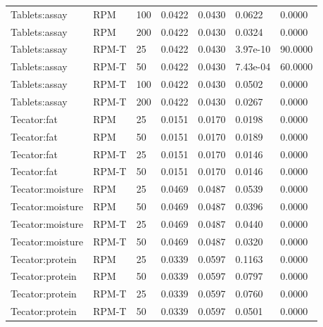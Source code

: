 \begin{tabular}{lllllll}
Tablets:assay & RPM & 100 & 0.0422 & 0.0430 & 0.0622 & 0.0000 \\
Tablets:assay & RPM & 200 & 0.0422 & 0.0430 & 0.0324 & 0.0000 \\
Tablets:assay & RPM-T & 25 & 0.0422 & 0.0430 & 3.97e-10 & 90.0000 \\
Tablets:assay & RPM-T & 50 & 0.0422 & 0.0430 & 7.43e-04 & 60.0000 \\
Tablets:assay & RPM-T & 100 & 0.0422 & 0.0430 & 0.0502 & 0.0000 \\
Tablets:assay & RPM-T & 200 & 0.0422 & 0.0430 & 0.0267 & 0.0000 \\
Tecator:fat & RPM & 25 & 0.0151 & 0.0170 & 0.0198 & 0.0000 \\
Tecator:fat & RPM & 50 & 0.0151 & 0.0170 & 0.0189 & 0.0000 \\
Tecator:fat & RPM-T & 25 & 0.0151 & 0.0170 & 0.0146 & 0.0000 \\
Tecator:fat & RPM-T & 50 & 0.0151 & 0.0170 & 0.0146 & 0.0000 \\
Tecator:moisture & RPM & 25 & 0.0469 & 0.0487 & 0.0539 & 0.0000 \\
Tecator:moisture & RPM & 50 & 0.0469 & 0.0487 & 0.0396 & 0.0000 \\
Tecator:moisture & RPM-T & 25 & 0.0469 & 0.0487 & 0.0440 & 0.0000 \\
Tecator:moisture & RPM-T & 50 & 0.0469 & 0.0487 & 0.0320 & 0.0000 \\
Tecator:protein & RPM & 25 & 0.0339 & 0.0597 & 0.1163 & 0.0000 \\
Tecator:protein & RPM & 50 & 0.0339 & 0.0597 & 0.0797 & 0.0000 \\
Tecator:protein & RPM-T & 25 & 0.0339 & 0.0597 & 0.0760 & 0.0000 \\
Tecator:protein & RPM-T & 50 & 0.0339 & 0.0597 & 0.0501 & 0.0000 \\
\hline
\end{tabular}
